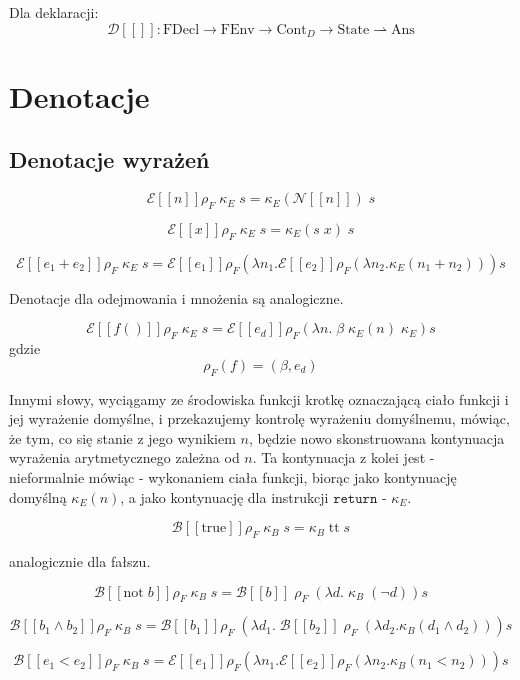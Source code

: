 \documentclass[a4paper]{article}
\begin{document}
Dla deklaracji:
$$
\mathcal{D}[\![]\!]: \text{FDecl} \longrightarrow \text{FEnv} \longrightarrow \text{Cont}_D \longrightarrow \text{State} \rightharpoonup \text{Ans}
$$


\section*{Denotacje}

\subsection*{Denotacje wyrażeń}

$$
\mathcal{E}[\![n]\!] \rho_F \; \kappa_E \; s = \kappa_E(\mathcal{N}[\![n]\!]) \; s
$$

$$
\mathcal{E}[\![ x ]\!] \rho_F \; \kappa_E \; s = \kappa_E(s \; x) \; s
$$

$$
\mathcal{E}[\![e_1 + e_2]\!] \rho_F \; \kappa_E \; s = \mathcal{E}[\![e_1]\!] \rho_F (\lambda n_1.
\mathcal{E}[\![e_2]\!] \rho_F (\lambda n_2.
\kappa_E (n_1+n_2))) s
$$

Denotacje dla odejmowania i mnożenia są analogiczne.

$$
\mathcal{E}[\![ f() ]\!] \rho_F \; \kappa_E \; s = \mathcal{E}[\![ e_d ]\!] \rho_F (\lambda n. \; \beta \; \kappa_E(n) \; \kappa_E) s
$$
gdzie
$$
\rho_F(f) = (\beta, e_d)
$$

Innymi słowy, wyciągamy ze środowiska funkcji krotkę oznaczającą ciało funkcji i jej wyrażenie domyślne, i przekazujemy kontrolę wyrażeniu domyślnemu, mówiąc, że tym, co się stanie z jego wynikiem $n$, będzie nowo skonstruowana kontynuacja wyrażenia arytmetycznego zależna od $n$. Ta kontynuacja z kolei jest - nieformalnie mówiąc - wykonaniem ciała funkcji, biorąc jako kontynuację domyślną $\kappa_E(n)$, a jako kontynuację dla instrukcji $\texttt{return}$ - $\kappa_E$.


$$
\mathcal{B}[\![ \text{true} ]\!] \rho_F \; \kappa_B \; s = \kappa_B \; \text{tt} \; s
$$

analogicznie dla fałszu.

$$
\mathcal{B}[\![ \text{not} \; b]\!] \rho_F \; \kappa_B \; s = \mathcal{B}[\![b]\!] \; \rho_F \; (\lambda d. \; \kappa_B \; (\lnot d) ) s
$$

$$
\mathcal{B}[\![b_1 \land b_2]\!] \rho_F \; \kappa_B \; s = \mathcal{B}[\![b_1 ]\!] \rho_F \; (\lambda d_1. \; \mathcal{B}[\![b_2]\!] \; \rho_F \; (\lambda d_2. \kappa_B(d_1 \land d_2))) s
$$

$$
\mathcal{B}[\![ e_1 < e_2 ]\!] \rho_F \; \kappa_B \; s = \mathcal{E}[\![e_1]\!] \rho_F (\lambda n_1.
\mathcal{E}[\![e_2]\!] \rho_F (\lambda n_2.
\kappa_B (n_1 < n_2))) s
$$
\end{document}
